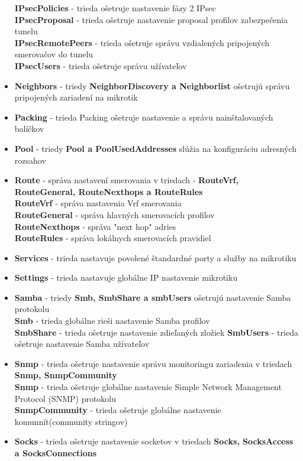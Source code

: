 \begin{itemize}
\textbf{IPsecPolicies} - trieda ošetruje nastavenie fázy 2 IPsec\\
\textbf{IPsecProposal} - trieda ošetruje nastavenie proposal profilov zabezpečenia tunelu\\
\textbf{IPsecRemotePeers} - trieda ošetruje správu vzdialených pripojených smerovačov do tunelu\\
\textbf{IPsecUsers} - trieda ošetruje správu užívateľov
\item \textbf{Neighbors} - triedy \textbf{NeighborDiscovery a Neighborlist} ošetrujú správu pripojených zariadení na mikrotik
\item \textbf{Packing} - trieda Packing ošetruje nastavenie a správu nainštalovaných balíčkov
\item \textbf{Pool} - triedy \textbf{Pool a PoolUsedAddresses} slúžia na konfiguráciu adresných rozsahov
\item \textbf{Route} - správa nastavení smerovania v triedach - \textbf{RouteVrf, RouteGeneral, RouteNexthops a RouteRules}\\
\textbf{RouteVrf} - správa nastavenia Vrf smerovania\\
\textbf{RouteGeneral} - správa hlavných smerovacích profilov\\
\textbf{RouteNexthops} - správa "next hop" adries\\
\textbf{RouteRules} - správa lokálnych smerovacích pravidiel
\item \textbf{Services} - trieda nastavuje povolené štandardné porty a služby na mikrotiku
\item \textbf{Settings} - trieda nastavuje globálne IP nastavenie mikrotiku
\item \textbf{Samba} - triedy \textbf{Smb, SmbShare a smbUsers} ošetrujú nastavenie Samba protokolu\\
\textbf{Smb} - trieda globálne rieši nastavenie Samba profilov\\
\textbf{SmbShare} - trieda ošetruje nastavenie zdieľaných zložiek
\textbf{SmbUsers} - trieda ošetruje nastavenie Samba užívateľov
\item \textbf{Snmp} - trieda ošetruje nastavenie správu monitoringu zariadenia v triedach \textbf{Snmp, SnmpCommunity}\\
\textbf{Snmp} - trieda ošetruje globálne nastavenie Simple Network Management Protocol (SNMP) protokolu\\
\textbf{SnmpCommunity} - trieda ošetruje globálne nastavenie komunnít(community stringov)
\item \textbf{Socks} - trieda ošetruje nastavenie socketov v triedach \textbf{Socks, SocksAccess a SocksConnections}

\end{itemize}
